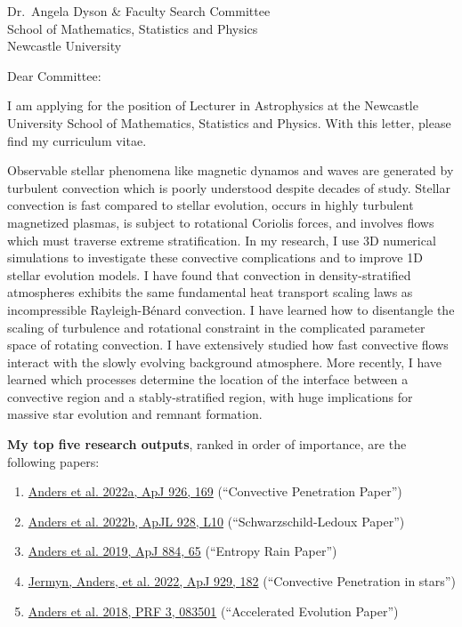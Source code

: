 \documentclass[12pt, a4paper]{letter}
\begin{document}
\begin{letter}{
        Dr.~Angela Dyson \& Faculty Search Committee \\
        School of Mathematics, Statistics and Physics \\
        Newcastle University}
\opening{Dear Committee:}

    I am applying for the position of Lecturer in Astrophysics at the Newcastle University School of Mathematics, Statistics and Physics.
    With this letter, please find my curriculum vitae.

    Observable stellar phenomena like magnetic dynamos and waves are generated by turbulent convection which is poorly understood despite decades of study.
    Stellar convection is fast compared to stellar evolution, occurs in highly turbulent magnetized plasmas, is subject to rotational Coriolis forces, and involves flows which must traverse extreme stratification.
    In my research, I use 3D numerical simulations to investigate these convective complications and to improve 1D stellar evolution models.
    I have found that convection in density-stratified atmospheres exhibits the same fundamental heat transport scaling laws as incompressible Rayleigh-B\'{e}nard convection.
    I have learned how to disentangle the scaling of turbulence and rotational constraint in the complicated parameter space of rotating convection.
    I have extensively studied how fast convective flows interact with the slowly evolving background atmosphere.
    More recently, I have learned which processes determine the location of the interface between a convective region and a stably-stratified region, with huge implications for massive star evolution and remnant formation.%

    \textbf{My top five research outputs}, ranked in order of importance, are the following papers:
    \begin{enumerate}
        \item \href{https://iopscience.iop.org/article/10.3847/1538-4357/ac408d}{Anders et al. 2022a, ApJ 926, 169} (“Convective Penetration Paper”)
        \item \href{https://iopscience.iop.org/article/10.3847/2041-8213/ac5cb5}{Anders et al. 2022b, ApJL 928, L10} (“Schwarzschild-Ledoux Paper”)
        \item \href{https://iopscience.iop.org/article/10.3847/1538-4357/ab3644}{Anders et al. 2019, ApJ 884, 65} (“Entropy Rain Paper”)
        \item \href{https://iopscience.iop.org/article/10.3847/1538-4357/ac5f08}{Jermyn, Anders, et al. 2022, ApJ 929, 182} (“Convective Penetration in stars”)
        \item \href{https://journals.aps.org/prfluids/abstract/10.1103/PhysRevFluids.3.083502}{Anders et al. 2018, PRF 3, 083501} (“Accelerated Evolution Paper”)
    \end{enumerate}


\end{letter}
\end{document}
